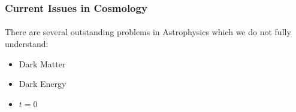 \begin{frame}
	\frametitle{Current Issues in Cosmology}
	\framesubtitle{}

	There are several outstanding problems in Astrophysics which we do not fully  understand:

	\begin{itemize}
		\pause\item Dark Matter
		\pause\item Dark Energy
		\pause\item $t=0$
	\end{itemize}
	
\end{frame}

